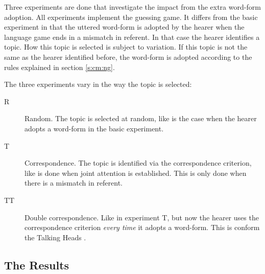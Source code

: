 Three experiments are done that investigate the impact from the extra word-form adoption. All experiments implement the guessing game. It differs from the basic experiment in that the uttered word-form is adopted by the hearer when the language game ends in a mismatch in referent. In that case the hearer identifies a topic. How this topic is selected is subject to variation. If this topic is not the same as the hearer identified before, the word-form is adopted according to the rules explained in section \ref{s:cm:ng}.

The three experiments vary in the way the topic is selected:

\begin{description}
\item[R] Random. The topic is selected at random, like is the case when the hearer adopts a word-form in the basic experiment.

\item[T] Correspondence. The topic is identified via the correspondence criterion, like is done when joint attention is established. This is only done when there is a mismatch in referent.

\item[TT] Double correspondence. Like in experiment T, but now the hearer uses the correspondence criterion {\em every time} it adopts a word-form. This is conform the Talking Heads \citep{steels:2000}.
\end{description}

\subsection{The Results}



